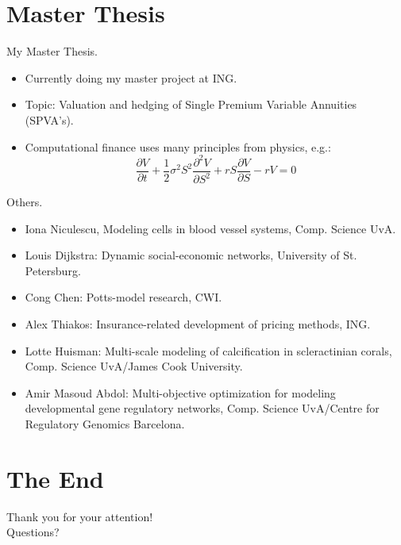 \documentclass[red]{beamer}
\begin{document}
\section{Master Thesis}

\begin{frame}{My Master Thesis.}
  \begin{itemize}
  \item 
    Currently doing my master project at ING.
  \item
    Topic: Valuation and hedging of Single Premium Variable Annuities (SPVA's).
  \item
    Computational finance uses many principles from physics, e.g.:\\
    \begin{equation*}
      \frac{\partial V}{\partial t} + \frac{1}{2}\sigma^2 S^2 \frac{\partial^2 V}{\partial S^2} + rS\frac{\partial V}{\partial S} - rV = 0
    \end{equation*}
  \end{itemize}
\end{frame}

\begin{frame}{Others.}
  \begin{itemize}
  \item 
    Iona Niculescu, Modeling cells in blood vessel systems, Comp. Science UvA.
  \item
    Louis Dijkstra: Dynamic social-economic networks, University of St. Petersburg.
  \item
    Cong Chen: Potts-model research, CWI.
  \item
    Alex Thiakos: Insurance-related development of pricing methods, ING.
  \item
    Lotte Huisman: Multi-scale modeling of calcification in scleractinian corals, Comp. Science UvA/James Cook University.
  \item
    Amir Masoud Abdol: Multi-objective optimization for modeling developmental gene regulatory networks, Comp. Science UvA/Centre for Regulatory Genomics Barcelona.
  \end{itemize}
\end{frame}

\section{The End}

\begin{frame}
  \begin{center}
    \vspace{20pt}
    \huge{Thank you for your attention!}\\
    \vspace{15pt}
    \Large{Questions?}
  \end{center}
\end{frame}
\end{document}
